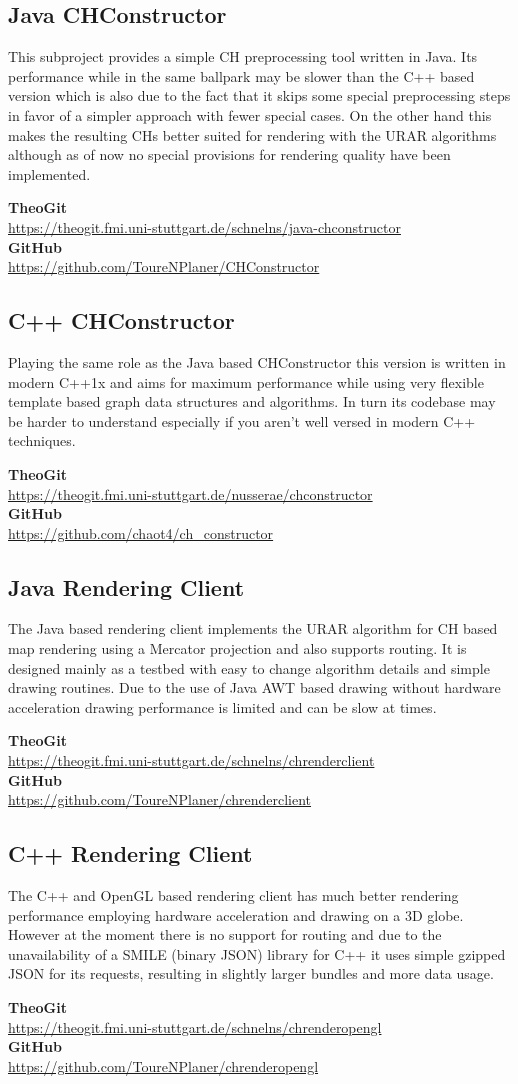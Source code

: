 \documentclass[titlepage,parskip=true]{scrartcl}
\newcommand{\repobox}[2]{
	\begin{shaded}
		\textbf{TheoGit}\\\hspace{5mm}\url{#1}\\
		\textbf{GitHub}\\\hspace{5mm}\url{#2}
	\end{shaded}
}
\begin{document}
\subsection{Java CHConstructor}
This subproject provides a simple CH preprocessing tool written in Java. Its
performance while in the same ballpark may be slower than the C++ based version
which is also due to the fact that it skips some special preprocessing steps in
favor of a simpler approach with fewer special cases. On the other hand this
makes the resulting CHs better suited for rendering with the URAR algorithms
although as of now no special provisions for rendering quality have been
implemented.
\repobox{https://theogit.fmi.uni-stuttgart.de/schnelns/java-chconstructor}{https://github.com/ToureNPlaner/CHConstructor}
\subsection{C++ CHConstructor}
Playing the same role as the Java based CHConstructor this version is written
in modern C++1x and aims for maximum performance while using very flexible
template based graph data structures and algorithms. In turn its codebase may
be harder to understand especially if you aren't well versed in modern C++
techniques.
\repobox{https://theogit.fmi.uni-stuttgart.de/nusserae/chconstructor}{https://github.com/chaot4/ch\_constructor}
\subsection{Java Rendering Client}
The Java based rendering client implements the URAR algorithm for CH based map
rendering using a Mercator projection and also supports routing. It is designed
mainly as a testbed with easy to change algorithm details and simple drawing
routines. Due to the use of Java AWT based drawing without hardware
acceleration drawing performance is limited and can be slow at times.
\repobox{https://theogit.fmi.uni-stuttgart.de/schnelns/chrenderclient}{https://github.com/ToureNPlaner/chrenderclient}
\subsection{C++ Rendering Client}
The C++ and OpenGL based rendering client has much better rendering performance
employing hardware acceleration and drawing on a 3D globe. However at the
moment there is no support for routing and due to the unavailability of a SMILE
(binary JSON) library for C++ it uses simple gzipped JSON for its requests,
resulting in slightly larger bundles and more data usage.
\repobox{https://theogit.fmi.uni-stuttgart.de/schnelns/chrenderopengl}{https://github.com/ToureNPlaner/chrenderopengl}
\end{document}
